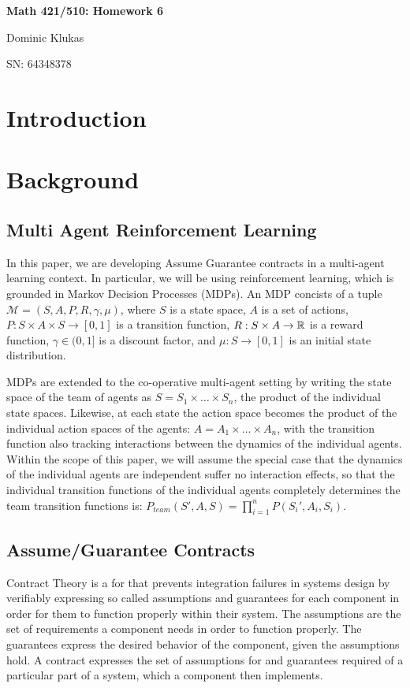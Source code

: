 \documentclass[11pt]{article}
\begin{document}
\noindent

\begin{center}
\textbf{Math 421/510: Homework 6}

Dominic Klukas

SN: 64348378
\end{center}

\vspace{1em}

\section{Introduction}


\section{Background}

\subsection{Multi Agent Reinforcement Learning}

In this paper, we are developing Assume Guarantee contracts in a multi-agent learning context.
In particular, we will be using reinforcement learning, which is grounded in Markov Decision Processes (MDPs).
An MDP concists of a tuple $\mathcal{M} = (S, A, P, R, \gamma, \mu)$, where $S$ is a state space, $A$ is a set of actions, $P : S \times A \times S \to [0, 1]$ is a transition function, $R : S \times A \to \mathbb{R}$ is a reward function, $\gamma \in (0, 1]$ is a discount factor, and $\mu : S \to [0, 1]$ is an initial state distribution. 

MDPs are extended to the co-operative multi-agent setting by writing the state space of the team of agents as $S = S_1 \times  \ldots \times  S_n$, the product of the individual state spaces.
Likewise, at each state the action space becomes the product of the individual action spaces of the agents: $A = A_1 \times  \ldots \times  A_n$, with the transition function also tracking interactions between the dynamics of the individual agents.
Within the scope of this paper, we will assume the special case that the dynamics of the individual agents are independent suffer no interaction effects, so that the individual transition functions of the individual agents completely determines the team transition functions is: $P_{team}(S', A, S) = \prod_{i = 1}^{n} P(S_i', A_i, S_i)$.

\subsection{Assume/Guarantee Contracts}
Contract Theory is a for that prevents integration failures in systems design by verifiably expressing so called assumptions and guarantees for each component in order for them to function properly within their system.
The assumptions are the set of requirements a component needs in order to function properly.
The guarantees express the desired behavior of the component, given the assumptions hold.
A contract expresses the set of assumptions for and guarantees required of a particular part of a system, which  a component then  implements.
\end{document}
